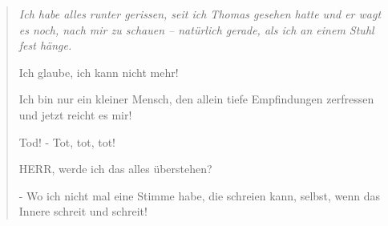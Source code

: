 \documentclass[10pt,a5paper]{book}
\newenvironment{tg}{\begin{quote}\em}{\end{quote}}
\begin{document}
\begin{tg}
Ich habe alles runter gerissen, seit ich Thomas gesehen hatte und er wagt es noch, nach mir zu schauen – natürlich gerade, als ich an einem Stuhl fest hänge.

Ich glaube, ich kann nicht mehr!

Ich bin  nur ein kleiner Mensch, den allein tiefe Empfindungen zerfressen und jetzt reicht es mir!

Tod! - Tot, tot, tot!

HERR, werde ich das alles überstehen?

- Wo ich nicht mal eine Stimme habe, die schreien kann, selbst, wenn das Innere schreit und schreit!
\end{tg}




 
 
 
\end{document}

